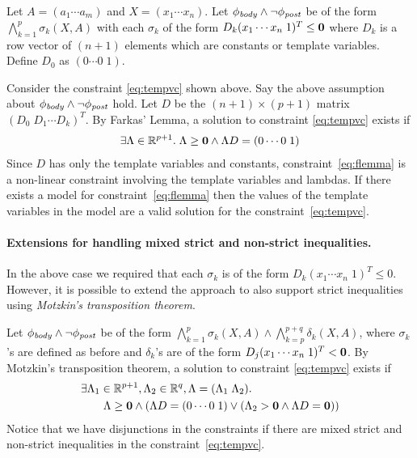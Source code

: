 \documentclass[a4paper,10pt]{article}
\begin{document}
Let $A = (a_1 \cdots a_m)$ and $X = (x_1 \cdots x_n)$.
Let $\mathit{\phi_{body}} \wedge \neg \mathit{\phi_{post}}$ be of the form 
$\bigwedge \limits_{k=1}^{p} \sigma_k(X,A)$ with each $\sigma_k$ of the form 
$D_k (x_1 \cdots x_n \; 1)^T \le \mathbf{0}$ where $D_k$ is a row vector of $(n+1)$ elements
which are constants or template variables.
Define $D_0$ as $(0 \cdots 0 \; 1)$.

Consider the constraint \ref{eq:tempvc} shown above. Say the above assumption about $\mathit{\phi_{body}} \wedge \neg \mathit{\phi_{post}}$ hold. 
Let $D$ be the $(n+1) \times (p+1)$ matrix $(D_0 \; D_1 \cdots D_k)^T$.
By Farkas' Lemma, a solution to constraint \ref{eq:tempvc} exists if
%
\begin{align}
\exists \Lambda \in \mathbb{R}^{p+1}. \; \Lambda \ge \mathbf{0} \wedge \Lambda D =(0 \cdots 0 \; 1) \label{eq:flemma}
\end{align}
%
Since $D$ has only the template variables and constants, constraint~\ref{eq:flemma} is a non-linear constraint involving the template variables and lambdas. If there exists a model for constraint~\ref{eq:flemma} then the values of the template variables in the model 
are a valid solution for the constraint~\ref{eq:tempvc}.

\paragraph{Extensions for handling mixed strict and non-strict inequalities.}

In the above case we required that each $\sigma_k$ is of the form 
$D_k (x_1 \cdots x_n \; 1)^T \le 0$. However, it is possible to extend the approach to
also support strict inequalities using \emph{Motzkin's transposition theorem}.

Let $\mathit{\phi_{body}} \wedge \neg \mathit{\phi_{post}}$ be of the form 
$\bigwedge \limits_{k=1}^{p} \sigma_k(X,A) \wedge \bigwedge \limits_{k=p}^{p+q} \delta_k(X,A)$,
where $\sigma_k$'s are defined as before and $\delta_k$'s are of the form 
$D_j (x_1 \cdots x_n \; 1)^T < \mathbf{0}$.
By Motzkin's transposition theorem, a solution to constraint \ref{eq:tempvc} exists if
%
\begin{align}
& \nonumber
\exists \Lambda_1 \in \mathbb{R}^{p+1}, \Lambda_2 \in \mathbb{R}^{q}, \Lambda = (\Lambda_1 \; \Lambda_2). \; \\ 
& \qquad \Lambda \ge \mathbf{0} \wedge (\Lambda D =(0 \cdots 0 \; 1) \vee (\Lambda_2 > \mathbf{0} \wedge \Lambda D = \mathbf{0})) \label{eq:motlemma}
\end{align}
%
Notice that we have disjunctions in the constraints if there are mixed strict and non-strict inequalities in the constraint~\ref{eq:tempvc}. 
\end{document}
